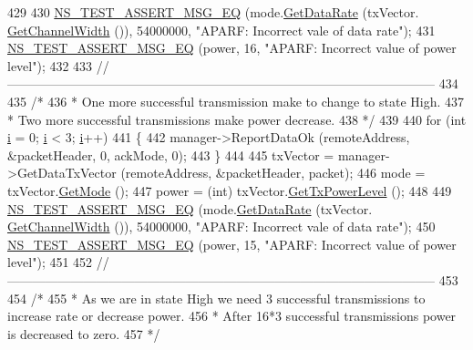\begin{DoxyCode}
429 
430   \hyperlink{group__testing_ga2a9d78cffb3db8e867c35fff0b698cf5}{NS\_TEST\_ASSERT\_MSG\_EQ} (mode.\hyperlink{classns3_1_1WifiMode_adcfbe150f69da720db23387f733b8a52}{GetDataRate} (txVector.
      \hyperlink{classns3_1_1WifiTxVector_a1f8bfa51778a3e217581eb665f059564}{GetChannelWidth} ()), 54000000, \textcolor{stringliteral}{"APARF: Incorrect vale of data rate"});
431   \hyperlink{group__testing_ga2a9d78cffb3db8e867c35fff0b698cf5}{NS\_TEST\_ASSERT\_MSG\_EQ} (power, 16, \textcolor{stringliteral}{"APARF: Incorrect value of power level"});
432 
433   \textcolor{comment}{//-----------------------------------------------------------------------------------------------------}
434 
435   \textcolor{comment}{/*}
436 \textcolor{comment}{   * One more successful transmission make to change to state High.}
437 \textcolor{comment}{   * Two more successful transmissions make power decrease.}
438 \textcolor{comment}{   */}
439 
440   \textcolor{keywordflow}{for} (\textcolor{keywordtype}{int} \hyperlink{bernuolliDistribution_8m_a6f6ccfcf58b31cb6412107d9d5281426}{i} = 0; \hyperlink{bernuolliDistribution_8m_a6f6ccfcf58b31cb6412107d9d5281426}{i} < 3; \hyperlink{bernuolliDistribution_8m_a6f6ccfcf58b31cb6412107d9d5281426}{i}++)
441     \{
442       manager->ReportDataOk (remoteAddress, &packetHeader, 0, ackMode, 0);
443     \}
444 
445   txVector = manager->GetDataTxVector (remoteAddress, &packetHeader, packet);
446   mode = txVector.\hyperlink{classns3_1_1WifiTxVector_a497b1f11cad4b8b26251dfa07c9ad1d6}{GetMode} ();
447   power = (int) txVector.\hyperlink{classns3_1_1WifiTxVector_a7c98bd9609ff1c5cefa6e22d6908a2fe}{GetTxPowerLevel} ();
448 
449   \hyperlink{group__testing_ga2a9d78cffb3db8e867c35fff0b698cf5}{NS\_TEST\_ASSERT\_MSG\_EQ} (mode.\hyperlink{classns3_1_1WifiMode_adcfbe150f69da720db23387f733b8a52}{GetDataRate} (txVector.
      \hyperlink{classns3_1_1WifiTxVector_a1f8bfa51778a3e217581eb665f059564}{GetChannelWidth} ()), 54000000, \textcolor{stringliteral}{"APARF: Incorrect vale of data rate"});
450   \hyperlink{group__testing_ga2a9d78cffb3db8e867c35fff0b698cf5}{NS\_TEST\_ASSERT\_MSG\_EQ} (power, 15, \textcolor{stringliteral}{"APARF: Incorrect value of power level"});
451 
452   \textcolor{comment}{//-----------------------------------------------------------------------------------------------------}
453 
454   \textcolor{comment}{/*}
455 \textcolor{comment}{   * As we are in state High we need 3 successful transmissions to increase rate or decrease power.}
456 \textcolor{comment}{   * After 16*3 successful transmissions power is decreased to zero.}
457 \textcolor{comment}{   */}

\end{DoxyCode}
